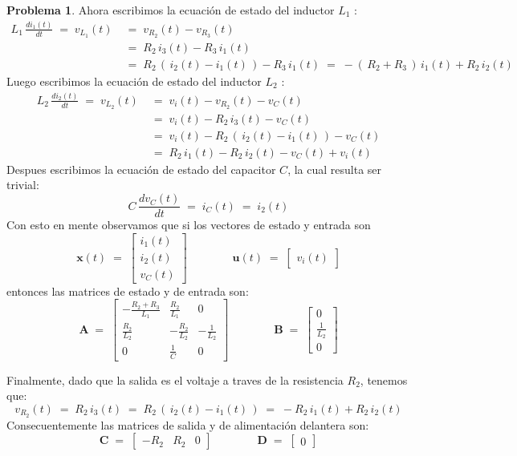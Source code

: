 \documentclass[ a4paper, twoside, 11pt]{article}
\renewcommand{\vec}[1]{{\boldsymbol{#1}}}
\theoremstyle{definition}
\newtheorem{problem}[definition]{Problema}
\begin{document}
\begin{problem}
Ahora escribimos la ecuaci\'on de estado del inductor $L_1$ : 
\begin{align*}
L_1 \, \frac{di_1(t)}{dt} \; = \; v_{L_1}(t) \; 
& = \; v_{R_2}(t) - v_{R_3}(t) \\
& = \; R_2 \, i_3(t) - R_3 \, i_1(t) \\
& = \; R_2 \, ( \, i_2(t) - i_1(t) \, ) - R_3 \, i_1(t) \; = \; 
- ( \, R_2 + R_3 \, ) \, i_1(t) + R_2 \, i_2(t)
\end{align*}
Luego escribimos la ecuaci\'on de estado del inductor $L_2$ : 
\begin{align*}
L_2 \, \frac{di_2(t)}{dt} \; = \; v_{L_2}(t) \; 
& = \; v_i(t) - v_{R_2}(t) - v_C(t) \\
& = \; v_i(t) - R_2 \, i_3(t) - v_C(t) \\
& = \; v_i(t) - R_2 \, ( \, i_2(t) - i_1(t) \, ) - v_C(t) \\
& = \; R_2 \, i_1(t) - R_2 \, i_2(t) - v_C(t) + v_i(t)
\end{align*}
Despues escribimos la ecuaci\'on de estado del capacitor $C$, la cual resulta ser trivial: 
\[
C \, \frac{dv_C(t)}{dt} \; = \; i_C(t) \; = \; i_2(t)
\]
Con esto en mente observamos que si los vectores de estado y entrada son 
\[
\vec{x}(t) \; = \; 
\left[ \begin{array}{c}
i_1(t) \\ i_2(t) \\ v_C(t)
\end{array} \right] \qquad \qquad
\vec{u}(t) \; = \; 
\left[ \begin{array}{c} v_i(t) \end{array} \right]
\]
entonces las matrices de estado y de entrada son: 
\[
\vec{A} \; = \; 
\left[ \begin{array}{ccc}
-\frac{R_2 + R_3}{L_1} & \frac{R_2}{L_1} & 0 \\[1ex]
\frac{R_2}{L_2} & -\frac{R_2}{L_2} & -\frac{1}{L_2} \\[1ex]
0 & \frac{1}{C} & 0
\end{array} \right] \qquad \qquad
\vec{B} \; = \; 
\left[ \begin{array}{c}
0 \\[1ex] \frac{1}{L_2} \\[1ex] 0
\end{array} \right]
\]

Finalmente, dado que la salida es el voltaje a traves de la resistencia $R_2$, tenemos que: 
\[
v_{R_2}(t) \; = \; R_2 \, i_3(t) \; = \; R_2 \, ( \, i_2(t) - i_1(t) \, ) \; = \; -R_2 \, i_1(t) + R_2 \, i_2(t)
\]
Consecuentemente las matrices de salida y de alimentaci\'on delantera son: 
\[
\vec{C} \; = \; 
\left[ \begin{array}{ccc}
-R_2 & R_2 & 0
\end{array} \right] \qquad \qquad
\vec{D} \; = \; 
\left[ \begin{array}{c} 0 \end{array} \right]
\]

\end{problem}
\vspace{\baselineskip}
\end{document}
